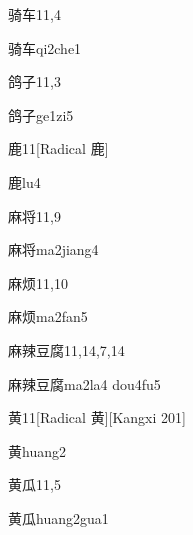 \begin{entry}{骑车}{11,4}
  \begin{phonetics}{骑车}{qi2che1}
  \end{phonetics}
\end{entry}

\begin{entry}{鸽子}{11,3}
  \begin{phonetics}{鸽子}{ge1zi5}
  \end{phonetics}
\end{entry}

\begin{entry}{鹿}{11}[Radical 鹿]
  \begin{phonetics}{鹿}{lu4}
  \end{phonetics}
\end{entry}

\begin{entry}{麻将}{11,9}
  \begin{phonetics}{麻将}{ma2jiang4}
  \end{phonetics}
\end{entry}

\begin{entry}{麻烦}{11,10}
  \begin{phonetics}{麻烦}{ma2fan5}
  \end{phonetics}
\end{entry}

\begin{entry}{麻辣豆腐}{11,14,7,14}
  \begin{phonetics}{麻辣豆腐}{ma2la4 dou4fu5}
  \end{phonetics}
\end{entry}

\begin{entry}{黄}{11}[Radical ⻩][Kangxi 201]
  \begin{phonetics}{黄}{huang2}
  \end{phonetics}
\end{entry}

\begin{entry}{黄瓜}{11,5}
  \begin{phonetics}{黄瓜}{huang2gua1}
  \end{phonetics}
\end{entry}

